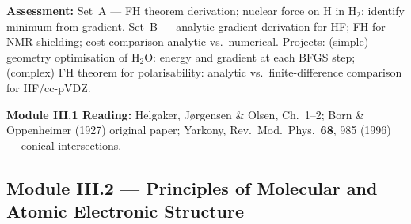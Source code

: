 \documentclass[11pt,a4paper]{article}
\begin{document}
\begin{tcolorbox}[chembox, title={Module~III.1 / L03: Parametric Dependence and the Feynman--Hellmann Theorem}]
\medskip\textbf{Assessment:}
Set~A --- FH theorem derivation; nuclear force on H in H$_2$; identify minimum from gradient.
Set~B --- analytic gradient derivation for HF; FH for NMR shielding; cost comparison analytic vs.\ numerical.
Projects: (simple) geometry optimisation of H$_2$O: energy and gradient at each BFGS step; (complex) FH theorem for polarisability: analytic vs.\ finite-difference comparison for HF/cc-pVDZ.
\end{tcolorbox}

\begin{tcolorbox}[highlightbox]
\textbf{Module III.1 Reading:} Helgaker, J\o rgensen \& Olsen, Ch.~1--2; Born \& Oppenheimer (1927) original paper; Yarkony, Rev.\ Mod.\ Phys.\ \textbf{68}, 985 (1996) --- conical intersections.
\end{tcolorbox}

\subsection{Module III.2 --- Principles of Molecular and Atomic Electronic Structure}
\label{sec:mod-III2}
\end{document}
